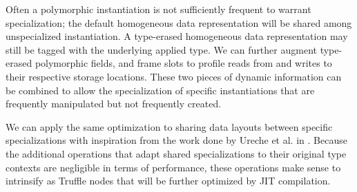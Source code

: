 Often a polymorphic instantiation is not sufficiently frequent to warrant specialization; the default homogeneous data representation will be shared among unspecialized instantiation.
A type-erased homogeneous data representation may still be tagged with the underlying applied type.
We can further augment type-erased polymorphic fields, and frame slots to profile reads from and writes to their respective storage locations.
These two pieces of dynamic information can be combined to allow the specialization of specific instantiations that are frequently manipulated but not frequently created.

We can apply the same optimization to sharing data layouts between specific specializations with inspiration from the work done by Ureche et al. in \cite{scala:miniboxing}.
Because the additional operations that adapt shared specializations to their original type contexts are negligible in terms of performance\cite{scala:miniboxing}, these operations make sense to intrinsify as Truffle nodes that will be further optimized by JIT compilation.